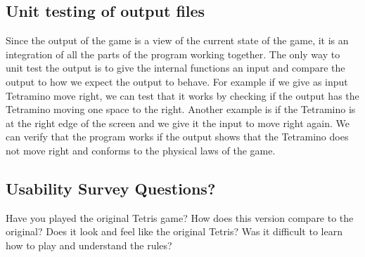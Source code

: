 \documentclass[12pt, titlepage]{article}
\begin{document}
\subsection{Unit testing of output files}	
Since the output of the game is a view of the current state of the game, it is an integration of all the parts of the program working together. The only way to unit test the output is to give the internal functions an input and compare the output to how we expect the output to behave. For example if we give as input Tetramino move right, we can test that it works by checking if the output has the Tetramino moving one space to the right. Another example is if the Tetramino is at the right edge of the screen and we give it the input to move right again. We can verify that the program works if the output shows that the Tetramino does not move right and conforms to the physical laws of the game.       	\newpage
\subsection{Usability Survey Questions?}

Have you played the original Tetris game?
How does this version compare to the original?
Does it look and feel like the original Tetris?
Was it difficult to learn how to play and understand the rules?
\end{document}

